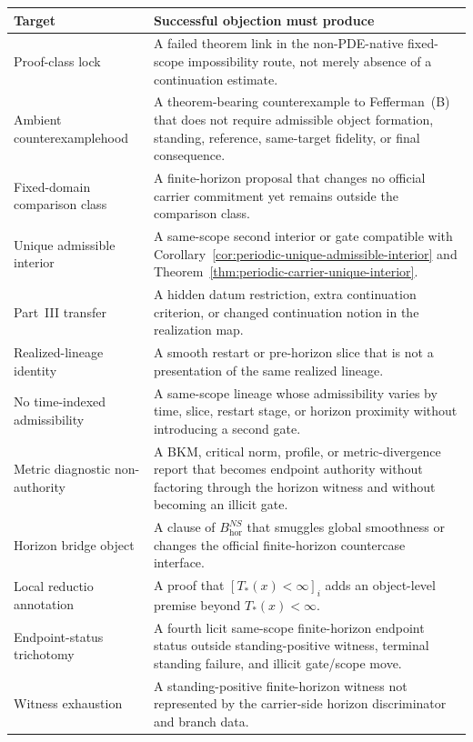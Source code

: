 \begin{center}
\scriptsize
\renewcommand{\arraystretch}{1.13}
\setlength{\tabcolsep}{3pt}
\begin{tabularx}{0.98\textwidth}{@{}L{0.31\textwidth}Y@{}}
\toprule
\textbf{Target} & \textbf{Successful objection must produce}\\
\midrule
Proof-class lock & A failed theorem link in the non-PDE-native fixed-scope impossibility route, not merely absence of a continuation estimate.\\
Ambient counterexamplehood & A theorem-bearing counterexample to Fefferman~(B) that does not require admissible object formation, standing, reference, same-target fidelity, or final consequence.\\
Fixed-domain comparison class & A finite-horizon proposal that changes no official carrier commitment yet remains outside the comparison class.\\
Unique admissible interior & A same-scope second interior or gate compatible with Corollary~\ref{cor:periodic-unique-admissible-interior} and Theorem~\ref{thm:periodic-carrier-unique-interior}.\\
Part~III transfer & A hidden datum restriction, extra continuation criterion, or changed continuation notion in the realization map.\\
Realized-lineage identity & A smooth restart or pre-horizon slice that is not a presentation of the same realized lineage.\\
No time-indexed admissibility & A same-scope lineage whose admissibility varies by time, slice, restart stage, or horizon proximity without introducing a second gate.\\
Metric diagnostic non-authority & A BKM, critical norm, profile, or metric-divergence report that becomes endpoint authority without factoring through the horizon witness and without becoming an illicit gate.\\
Horizon bridge object & A clause of $B^{NS}_{\mathrm{hor}}$ that smuggles global smoothness or changes the official finite-horizon countercase interface.\\
Local reductio annotation & A proof that $[T_*(x)<\infty]_i$ adds an object-level premise beyond $T_*(x)<\infty$.\\
Endpoint-status trichotomy & A fourth licit same-scope finite-horizon endpoint status outside standing-positive witness, terminal standing failure, and illicit gate/scope move.\\
Witness exhaustion & A standing-positive finite-horizon witness not represented by the carrier-side horizon discriminator and branch data.\\

\end{tabularx}
\end{center}
